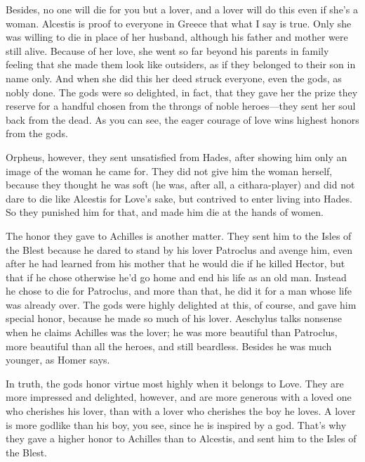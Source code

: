 Besides, no one will die for you but a lover, and a lover will do this
even if she's a woman. Alcestis is proof to everyone in Greece that what
 I say is
true. Only she was
willing to die in place of her husband, although his father and mother
were still alive. Because of her love, she went so far beyond his
parents in family feeling that she made them look like outsiders, as if
they belonged to their son in name only. And when she did this her deed
struck everyone, even the gods, as nobly done. The gods were so
delighted, in fact, that they gave her the prize they reserve for a
handful  chosen from the throngs of noble heroes---they sent her
soul back from the dead. As you can see, the eager courage of love wins
highest honors from the gods.

Orpheus, however, they sent unsatisfied from Hades, after showing him
only an image of the woman he came for. They did not give him the woman
herself, because they thought he was soft (he was, after all, a
cithara-player) and did not dare to die like Alcestis for Love's sake,
but contrived to enter living into Hades. So they punished him for that,
and  made him die at the hands of
women.

The honor they gave to Achilles is another matter. They sent him to the
Isles of the Blest because he dared to stand by his lover Patroclus and
 avenge him, even after he had learned from his mother
that he would die if he killed Hector, but that if he chose otherwise
he'd go home and end his life as an old man. Instead he chose to die for
Patroclus, and more than that, he did it for a man whose life was
already over. The gods were highly delighted at this, of course, and
gave him special honor, because he made so much of his lover. Aeschylus
talks nonsense when he claims Achilles was the
lover; he was more
beautiful than Patroclus, more beautiful than all the heroes, and still
beardless. Besides he was much younger, as Homer says.

In truth, the gods honor virtue most highly when it belongs to Love.
 They are more impressed and delighted, however, and are more
generous with a loved one who cherishes his lover, than with a lover who
cherishes the boy he loves. A lover is more godlike than his boy, you
see, since he is inspired by a god. That's why they gave a higher honor
to Achilles than to Alcestis, and sent him to the Isles of the Blest.


